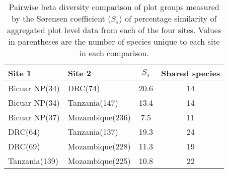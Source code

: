 \begin{table}[!htbp]
	\caption[Pairwise S\o{}rensen coefficient of similarity among sites]{Pairwise beta diversity comparison of plot groups measured by the S\o{}rensen coefficient ($S_s$) of percentage similarity of aggregated plot level data from each of the four sites. Values in parentheses are the number of species unique to each site in each comparison.} 
	\label{bicuar:site_pairs_js} 
\begin{tabular}{llSS} 
\toprule
{Site 1} & {Site 2} & {$S_s$} & {Shared species} \\
\midrule
Bicuar NP(34) & DRC(74) & 20.6 & 14 \\ 
Bicuar NP(34) & Tanzania(147) & 13.4 & 14 \\ 
Bicuar NP(37) & Mozambique(236) & 7.5 & 11 \\ 
DRC(64) & Tanzania(137) & 19.3 & 24 \\ 
DRC(69) & Mozambique(228) & 11.3 & 19 \\ 
Tanzania(139) & Mozambique(225) & 10.8 & 22 \\ 
\bottomrule
\end{tabular} 
\end{table} 
